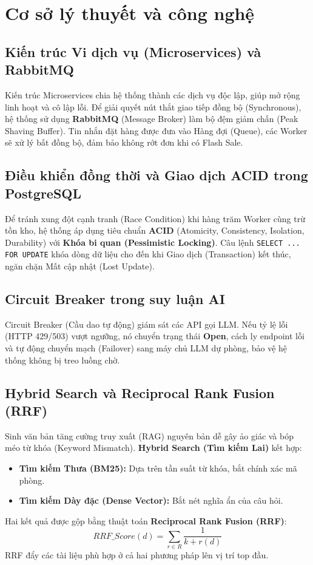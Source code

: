 \section{Cơ sở lý thuyết và công nghệ}

\subsection{Kiến trúc Vi dịch vụ (Microservices) và RabbitMQ}
Kiến trúc Microservices chia hệ thống thành các dịch vụ độc lập, giúp mở rộng linh hoạt và cô lập lỗi. Để giải quyết nút thắt giao tiếp đồng bộ (Synchronous), hệ thống sử dụng \textbf{RabbitMQ} (Message Broker) làm bộ đệm giảm chấn (Peak Shaving Buffer). Tin nhắn đặt hàng được đưa vào Hàng đợi (Queue), các Worker sẽ xử lý bất đồng bộ, đảm bảo không rớt đơn khi có Flash Sale.

\subsection{Điều khiển đồng thời và Giao dịch ACID trong PostgreSQL}
Để tránh xung đột cạnh tranh (Race Condition) khi hàng trăm Worker cùng trừ tồn kho, hệ thống áp dụng tiêu chuẩn \textbf{ACID} (Atomicity, Consistency, Isolation, Durability) với \textbf{Khóa bi quan (Pessimistic Locking)}. Câu lệnh \texttt{SELECT ... FOR UPDATE} khóa dòng dữ liệu cho đến khi Giao dịch (Transaction) kết thúc, ngăn chặn Mất cập nhật (Lost Update).

\subsection{Circuit Breaker trong suy luận AI}
Circuit Breaker (Cầu dao tự động) giám sát các API gọi LLM. Nếu tỷ lệ lỗi (HTTP 429/503) vượt ngưỡng, nó chuyển trạng thái \textbf{Open}, cách ly endpoint lỗi và tự động chuyển mạch (Failover) sang máy chủ LLM dự phòng, bảo vệ hệ thống không bị treo luồng chờ.

\subsection{Hybrid Search và Reciprocal Rank Fusion (RRF)}
Sinh văn bản tăng cường truy xuất (RAG) nguyên bản dễ gây ảo giác và bóp méo từ khóa (Keyword Mismatch). \textbf{Hybrid Search (Tìm kiếm Lai)} kết hợp:
\begin{itemize}
    \item \textbf{Tìm kiếm Thưa (BM25):} Dựa trên tần suất từ khóa, bắt chính xác mã phòng.
    \item \textbf{Tìm kiếm Dày đặc (Dense Vector):} Bắt nét nghĩa ẩn của câu hỏi.
\end{itemize}
Hai kết quả được gộp bằng thuật toán \textbf{Reciprocal Rank Fusion (RRF)}:
\begin{equation}
RRF\_Score(d) = \sum_{r \in R} \frac{1}{k + r(d)}
\end{equation}
RRF đẩy các tài liệu phù hợp ở cả hai phương pháp lên vị trí top đầu.

